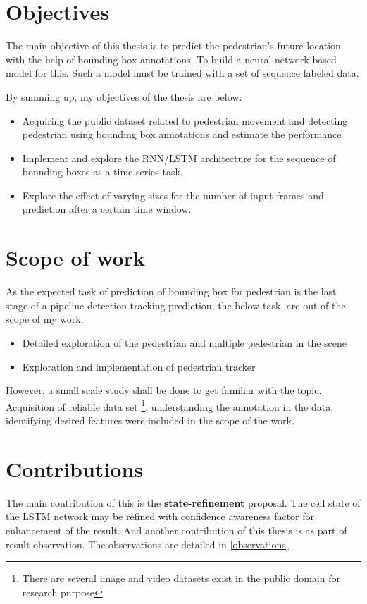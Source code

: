 \section{Objectives}
\newpara The main objective of this thesis is to predict the pedestrian's future location with the help of bounding box annotations. To build a neural network-based model for this. Such a model must be trained with a set of sequence labeled data.

By summing up, my objectives of the thesis are below:
\begin{itemize}
	\item  Acquiring the public dataset related to pedestrian movement and detecting pedestrian using bounding box annotations and estimate the performance

	\item Implement and explore the RNN/LSTM architecture for the sequence of bounding boxes as a time series task.
	\item Explore the effect of varying sizes for the number of input frames and prediction after a certain time window.
\end{itemize}

\section{Scope of work}
As the expected task of prediction of bounding box for pedestrian is the last stage of a pipeline detection-tracking-prediction, the below task, are out of the scope of my work.
\begin{itemize}
	\item Detailed exploration of the pedestrian and multiple pedestrian in the scene
	\item Exploration and implementation of pedestrian tracker
\end{itemize}
However, a small scale study shall be done to get familiar with the topic.  Acquisition of reliable data set \footnote{There are several image and video datasets exist in the public domain for research purpose}, understanding the annotation in the data, identifying desired features were included in the scope of the work.

\section{Contributions}
The main contribution of this is the \textbf{state-refinement } proposal. The cell state of the LSTM network may be refined with confidence awareness factor for enhancement of the result. And another contribution of this thesis is as part of result observation. The observations are detailed in \ref{observations}.

